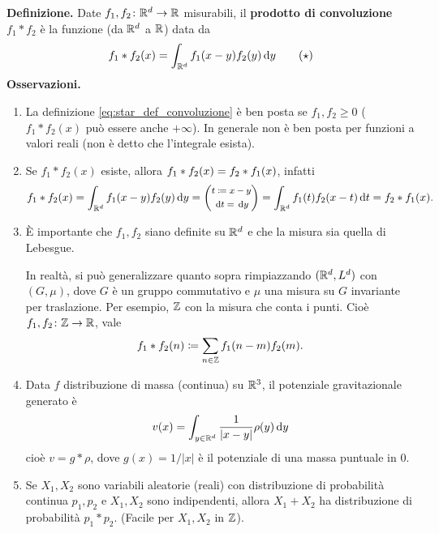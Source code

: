 \textbf{Definizione.} Date $f_1,f_2 \colon  \mathbb R^d \to \mathbb R$ misurabili, il \textbf{prodotto di convoluzione} $f_1 \ast f_2$ è la funzione (da $\mathbb R^d$ a $\mathbb R$) data da
%
\begin{equation} \label{eq:star_def_convoluzione}
	f_1 \ast f_2(x) = \int_{\mathbb R^d} f_1(x-y) f_2(y) \,\mathrm{d} y
	\tag{$\star$}
\end{equation}
%
\textbf{Osservazioni.}
\begin{enumerate}
\item La definizione \eqref{eq:star_def_convoluzione} è ben posta se $f_1,f_2 \geq 0$ ($f_1 \ast f_2(x)$ può essere anche $+\infty$).
In generale non è ben posta per funzioni a valori reali (non è detto che l'integrale esista).

\item Se $f_1 \ast f_2(x)$ esiste, allora $\displaystyle f_1 \ast f_2(x) = f_2 \ast f_1(x)$, infatti
%
$$
f_1 \ast f_2 (x) 
= \int_{\mathbb R^d} f_1(x-y) f_2(y) \,\mathrm{d} y 
= \left( 
{\footnotesize \begin{gathered}
	t \coloneqq x - y \\ 
	\,\mathrm{d} t = \,\mathrm{d} y
\end{gathered}}
\right) =
\int_{\mathbb R^d} f_1(t) f_2(x-t) \,\mathrm{d} t 
= f_2 \ast f_1(x).
$$
%

\item È importante che $f_1,f_2$ siano definite su $\mathbb R^d$ e che la misura sia quella di Lebesgue.

In realtà, si può generalizzare quanto sopra rimpiazzando $(\mathbb R^d, L^d)$ con $(G,\mu)$, dove $G$ è un gruppo commutativo e $\mu$ una misura su $G$ invariante per traslazione. Per esempio, $\mathbb Z$ con la misura che conta i punti. Cioè $f_1,f_2 \colon \mathbb Z \to \mathbb R$, vale
%
$$
f_1 \ast f_2(n) \coloneqq \sum_{n \in \mathbb Z} f_1(n - m) f_2(m).
$$
%

\item Data $f$ distribuzione di massa (continua) su $\mathbb R^3$, il potenziale gravitazionale generato è
%
$$
v(x) = \int_{y \in \mathbb R^d} \frac{1}{\left| x - y \right|} \rho(y) \,\mathrm{d} y
$$
%
cioè $v = g \ast \rho$, dove  $g (x) = 1 / \left| x \right|$ è il potenziale di una massa puntuale in $0$.

\item Se $X_1, X_2$ sono variabili aleatorie (reali) con distribuzione di probabilità continua $p_1,p_2$ e $X_1,X_2$ sono indipendenti, allora $X_1 + X_2$ ha distribuzione di probabilità $p_1 \ast p_2$. (Facile per $X_1,X_2$ in $\mathbb Z$).

\end{enumerate}

